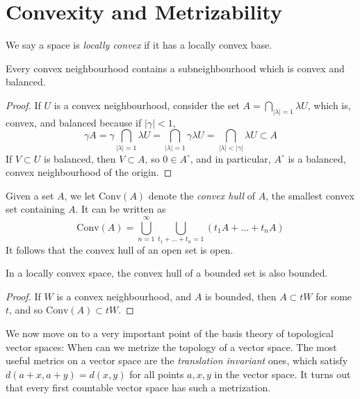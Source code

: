 \section{Convexity and Metrizability}

We say a space is \emph{locally convex} if it has a locally convex base.

\begin{theorem}
    Every convex neighbourhood contains a subneighbourhood which is convex and balanced.
\end{theorem}
\begin{proof}
    If $U$ is a convex neighbourhood, consider the set $A = \bigcap_{|\lambda| = 1} \lambda U$, which is, convex, and balanced because if $|\gamma| < 1$,
    \[ \gamma A = \gamma \bigcap_{|\lambda| = 1} \lambda U = \bigcap_{|\lambda| = 1} \gamma \lambda U = \bigcap_{|\lambda| < |\gamma|} \lambda U \subset A \]
    If $V \subset U$ is balanced, then $V \subset A$, so $0 \in A^\circ$, and in particular, $A^\circ$ is a balanced, convex neighbourhood of the origin.
\end{proof}

Given a set $A$, we let $\text{Conv}(A)$ denote the \emph{convex hull} of $A$, the smallest convex set containing $A$. It can be written as
%
\[ \text{Conv}(A) = \bigcup_{n = 1}^\infty \bigcup_{t_1 + \dots + t_n = 1} (t_1A + \dots + t_nA) \]
%
It follows that the convex hull of an open set is open.

\begin{theorem}
    In a locally convex space, the convex hull of a bounded set is also bounded.
\end{theorem}
\begin{proof}
    If $W$ is a convex neighbourhood, and $A$ is bounded, then $A \subset tW$ for some $t$, and so $\text{Conv}(A) \subset tW$.
\end{proof}

We now move on to a very important point of the basis theory of topological vector spaces: When can we metrize the topology of a vector space. The most useful metrics on a vector space are the \emph{translation invariant} ones, which satisfy $d(a + x, a + y) = d(x,y)$ for all points $a,x,y$ in the vector space. It turns out that every first countable vector space has such a metrization.

